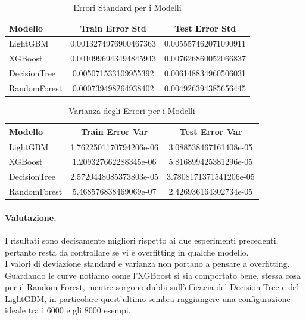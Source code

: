 \begin{table}[H]
    \centering
    \begin{tabular}{lcc}
    \toprule
    \textbf{Modello} & \textbf{Train Error Std} & \textbf{Test Error Std} \\
    \midrule
    LightGBM & 0.0013274976900467363 & 0.005557462071090911 \\
    XGBoost & 0.0010996943494845943 & 0.007626860052066837 \\
    DecisionTree & 0.005071533109955392 & 0.006148834960506031 \\
    RandomForest & 0.000739498264938402 & 0.004926394385656445 \\
    \bottomrule
    \end{tabular}
    \caption{Errori Standard per i Modelli}
\end{table}

\begin{table}[H]
    \centering
    \begin{tabular}{lcc}
    \toprule
    \textbf{Modello} & \textbf{Train Error Var} & \textbf{Test Error Var} \\
    \midrule
    LightGBM & 1.7622501170794206e-06 & 3.088538467161408e-05 \\
    XGBoost & 1.209327662288345e-06 & 5.816899425381296e-05 \\
    DecisionTree & 2.5720448085373803e-05 & 3.7808171371541206e-05 \\
    RandomForest & 5.468576838469069e-07 & 2.426936164302734e-05 \\
    \bottomrule
    \end{tabular}
    \caption{Varianza degli Errori per i Modelli}
\end{table}

\paragraph{Valutazione.} I risultati sono decisamente migliori rispetto ai due esperimenti precedenti, pertanto resta da controllare se vi è overfitting in qualche modello. \\ I valori di deviazione standard e varianza non portano a pensare a overfitting. Guardando le curve notiamo come l'XGBoost si sia comportato bene, stessa cosa per il Random Forest, mentre sorgono dubbi sull'efficacia del Decision Tree e del LightGBM, in particolare quest'ultimo sembra raggiungere una configurazione ideale tra i 6000 e gli 8000 esempi.

